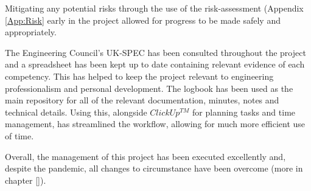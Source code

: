 Mitigating any potential risks through the use of the risk-assessment (Appendix \ref{App:Risk} early in the project allowed for progress to be made safely and appropriately. 

The Engineering Council's UK-SPEC has been consulted throughout the project and a spreadsheet has been kept up to date containing relevant evidence of each competency. This has helped to keep the project relevant to engineering professionalism and personal development. The logbook has been used as the main repository for all of the relevant documentation, minutes, notes and technical details. Using this, alongside $ClickUp^{TM}$ for planning tasks and time management, has streamlined the workflow, allowing for much more efficient use of time.

Overall, the management of this project has been executed excellently and, despite the pandemic, all changes to circumstance have been overcome (more in chapter \ref{}).



